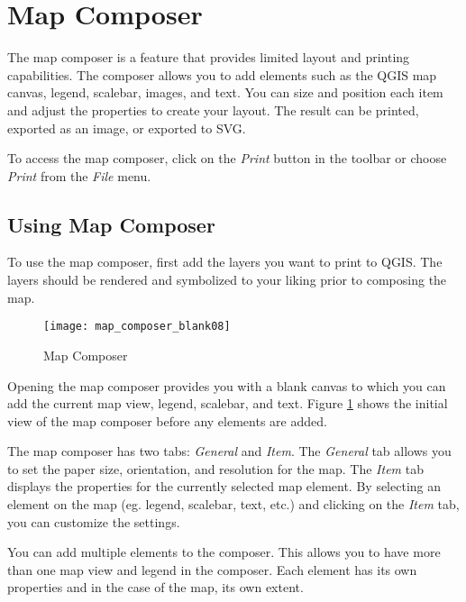 
\section{Map Composer}\label{label_mapcomposer}

The map composer is a feature that provides limited layout and printing
capabilities. The composer allows you to add elements such as the QGIS map
canvas, legend, scalebar, images, and text. You can size and position each item and
adjust the properties to create your layout. The result can be printed,
exported as an image, or exported to SVG.

To access the map composer, click on the \textit{Print} button in the toolbar
or choose \textit{Print} from the \textit{File} menu.

\subsection{Using Map Composer}\label{label_usemapcomposer} 

To use the map composer, first add the layers you
want to print to QGIS. The layers should be rendered and symbolized to your
liking prior to composing the map. 

\begin{figure}[ht]
   \begin{center}
   \caption{Map Composer}\label{fig:map_composer_blank}\smallskip
   \texttt{[image: map\_composer\_blank08]}
\end{center}  
\end{figure}

Opening the map composer provides you with a blank canvas to which you can add
the current map view, legend, scalebar, and text. Figure
\ref{fig:map_composer_blank} shows the initial view of the map composer before
any elements are added.

The map composer has two tabs: \textit{General} and \textit{Item}. The
\textit{General} tab allows you to set the paper size, orientation, and
resolution for the map. The \textit{Item} tab displays the properties for the
currently selected map element. By selecting an element on the map (eg.
legend, scalebar, text, etc.) and clicking on the \textit{Item} tab, you can
customize the settings.

You can add multiple elements to the composer. This allows you to have more
than one map view and legend in the composer. Each element has its own
properties and in the case of the map, its own extent.

